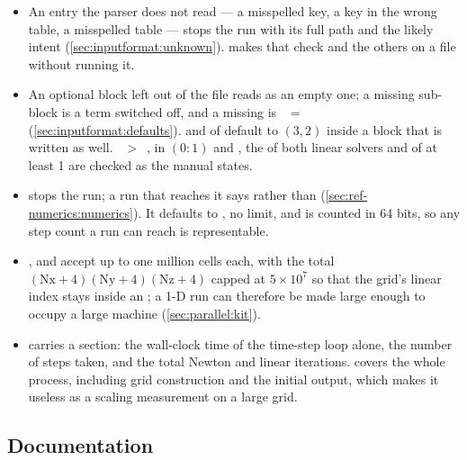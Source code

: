 \begin{itemize}
    case).
  \item An entry the parser does not read --- a misspelled key, a key in the
    wrong table, a misspelled table --- stops the run with its full path and
    the likely intent (\cref{sec:inputformat:unknown}).
     makes that check and the others on a file
    without running it.
  \item An optional block left out of the file reads as an empty one; a
    missing  sub-block is a term switched off, and a missing
     is ~$=$~
    (\cref{sec:inputformat:defaults}).  and
     of  default to
    $(3,2)$ inside a block that is written as well.
    ~$>$~,  in $(0:1)$
    and , the  of both linear solvers
    and  of at least 1 are checked as the manual states.
  \item {} stops the run; a run that reaches it says
     rather than
    (\cref{sec:ref-numerics:numerics}). It defaults to , no limit, and
    is counted in 64 bits, so any step count a run can reach is representable.
  \item {},  and  accept up to one million cells
    each, with the total
    $(\mathrm{Nx}+4)(\mathrm{Ny}+4)(\mathrm{Nz}+4)$ capped at $5\times10^{7}$
    so that the grid's linear index stays inside an ; a 1-D run can
    therefore be made large enough to occupy a large machine
    (\cref{sec:parallel:kit}).
  \item {} carries a  section: the wall-clock time of the time-step loop alone,
    the number of steps taken, and the total Newton and linear iterations.
     covers the whole process, including grid
    construction and the initial output, which makes it useless as a scaling
    measurement on a large grid.
\end{itemize}

\subsection*{Documentation}

